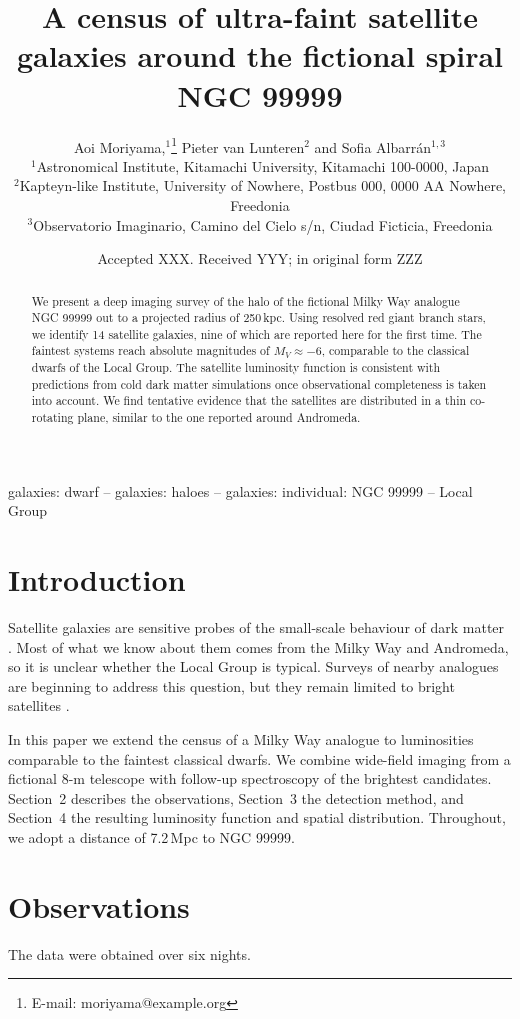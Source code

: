\documentclass[fleqn,usenatbib]{mnras}
\title[Faint satellites of NGC 99999]{A census of ultra-faint satellite galaxies around the fictional spiral NGC 99999}
\author[A. Moriyama et al.]{
Aoi Moriyama,$^{1}$\thanks{E-mail: moriyama@example.org}
Pieter van Lunteren$^{2}$
and Sofia Albarr\'an$^{1,3}$
\\
$^{1}$Astronomical Institute, Kitamachi University, Kitamachi 100-0000, Japan\\
$^{2}$Kapteyn-like Institute, University of Nowhere, Postbus 000, 0000 AA Nowhere, Freedonia\\
$^{3}$Observatorio Imaginario, Camino del Cielo s/n, Ciudad Ficticia, Freedonia
}
\date{Accepted XXX. Received YYY; in original form ZZZ}
\begin{document}
\label{firstpage}
\pagerange{\pageref{firstpage}--\pageref{lastpage}}
\maketitle
\begin{abstract}
We present a deep imaging survey of the halo of the fictional Milky Way analogue NGC 99999 out to a projected radius of 250\,kpc.
Using resolved red giant branch stars, we identify 14 satellite galaxies, nine of which are reported here for the first time.
The faintest systems reach absolute magnitudes of $M_V \approx -6$, comparable to the classical dwarfs of the Local Group.
The satellite luminosity function is consistent with predictions from cold dark matter simulations once observational completeness is taken into account.
We find tentative evidence that the satellites are distributed in a thin co-rotating plane, similar to the one reported around Andromeda.
\end{abstract}
\begin{keywords}
galaxies: dwarf -- galaxies: haloes -- galaxies: individual: NGC 99999 -- Local Group
\end{keywords}
\section{Introduction}
Satellite galaxies are sensitive probes of the small-scale behaviour of dark matter \citep{moriyama2020,lunteren2022}.
Most of what we know about them comes from the Milky Way and Andromeda, so it is unclear whether the Local Group is typical.
Surveys of nearby analogues are beginning to address this question, but they remain limited to bright satellites \citep{albarran2023}.

In this paper we extend the census of a Milky Way analogue to luminosities comparable to the faintest classical dwarfs.
We combine wide-field imaging from a fictional 8-m telescope with follow-up spectroscopy of the brightest candidates.
Section~2 describes the observations, Section~3 the detection method, and Section~4 the resulting luminosity function and spatial distribution.
Throughout, we adopt a distance of 7.2\,Mpc to NGC 99999.

\section{Observations}
The data were obtained over six nights.


\label{lastpage}
\end{document}
